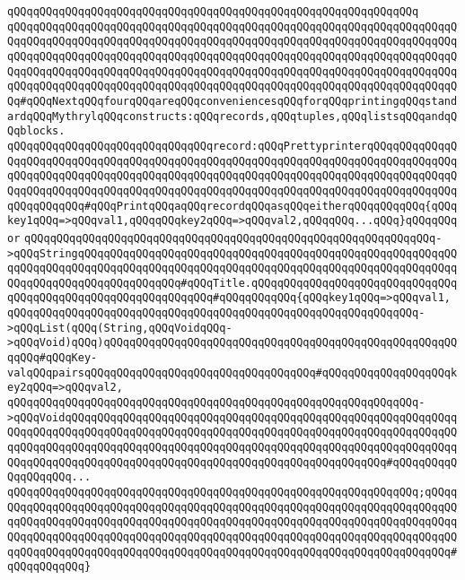 \verb|qQQqqQQqqQQqqQQqqQQqqQQqqQQqqQQqqQQqqQQqqQQqqQQqqQQqqQQqqQQqqQQq|\newline
\verb|qQQqqQQqqQQqqQQqqQQqqQQqqQQqqQQqqQQqqQQqqQQqqQQqqQQqqQQqqQQqqQQqqQQqqQQqqQQqqQQqqQQqqQQqqQQqqQQqqQQqqQQqqQQqqQQqqQQqqQQqqQQqqQQqqQQqqQQqqQQqqQQqqQQqqQQqqQQqqQQqqQQqqQQqqQQqqQQqqQQqqQQqqQQqqQQqqQQqqQQqqQQqqQQqqQQqqQQqqQQqqQQqqQQqqQQqqQQqqQQqqQQqqQQqqQQqqQQqqQQqqQQqqQQqqQQqqQQqqQQqqQQqqQQqqQQqqQQqqQQqqQQqqQQqqQQqqQQqqQQqqQQqqQQqqQQqqQQqqQQqqQQqqQQqqQQq#qQQqNextqQQqfourqQQqareqQQqconveniencesqQQqforqQQqprintingqQQqstandardqQQqMythrylqQQqconstructs:qQQqrecords,qQQqtuples,qQQqlistsqQQqandqQQqblocks.|\newline
\newline
\verb|qQQqqQQqqQQqqQQqqQQqqQQqqQQqqQQqrecord:qQQqPrettyprinterqQQqqQQqqQQqqQQqqQQqqQQqqQQqqQQqqQQqqQQqqQQqqQQqqQQqqQQqqQQqqQQqqQQqqQQqqQQqqQQqqQQqqQQqqQQqqQQqqQQqqQQqqQQqqQQqqQQqqQQqqQQqqQQqqQQqqQQqqQQqqQQqqQQqqQQqqQQqqQQqqQQqqQQqqQQqqQQqqQQqqQQqqQQqqQQqqQQqqQQqqQQqqQQqqQQqqQQqqQQqqQQqqQQqqQQqqQQq#qQQqPrintqQQqaqQQqrecordqQQqasqQQqeitherqQQqqQQqqQQq{qQQqkey1qQQq=>qQQqval1,qQQqqQQqkey2qQQq=>qQQqval2,qQQqqQQq...qQQq}qQQqqQQqor|\newline
\verb|qQQqqQQqqQQqqQQqqQQqqQQqqQQqqQQqqQQqqQQqqQQqqQQqqQQqqQQqqQQqqQQq->qQQqStringqQQqqQQqqQQqqQQqqQQqqQQqqQQqqQQqqQQqqQQqqQQqqQQqqQQqqQQqqQQqqQQqqQQqqQQqqQQqqQQqqQQqqQQqqQQqqQQqqQQqqQQqqQQqqQQqqQQqqQQqqQQqqQQqqQQqqQQqqQQqqQQqqQQqqQQqqQQq#qQQqTitle.qQQqqQQqqQQqqQQqqQQqqQQqqQQqqQQqqQQqqQQqqQQqqQQqqQQqqQQqqQQqqQQq#qQQqqQQqqQQq{qQQqkey1qQQq=>qQQqval1,|\newline
\verb|qQQqqQQqqQQqqQQqqQQqqQQqqQQqqQQqqQQqqQQqqQQqqQQqqQQqqQQqqQQqqQQq->qQQqList(qQQq(String,qQQqVoidqQQq->qQQqVoid)qQQq)qQQqqQQqqQQqqQQqqQQqqQQqqQQqqQQqqQQqqQQqqQQqqQQqqQQqqQQqqQQq#qQQqKey-valqQQqpairsqQQqqQQqqQQqqQQqqQQqqQQqqQQqqQQqqQQq#qQQqqQQqqQQqqQQqqQQqkey2qQQq=>qQQqval2,|\newline
\verb|qQQqqQQqqQQqqQQqqQQqqQQqqQQqqQQqqQQqqQQqqQQqqQQqqQQqqQQqqQQqqQQq->qQQqVoidqQQqqQQqqQQqqQQqqQQqqQQqqQQqqQQqqQQqqQQqqQQqqQQqqQQqqQQqqQQqqQQqqQQqqQQqqQQqqQQqqQQqqQQqqQQqqQQqqQQqqQQqqQQqqQQqqQQqqQQqqQQqqQQqqQQqqQQqqQQqqQQqqQQqqQQqqQQqqQQqqQQqqQQqqQQqqQQqqQQqqQQqqQQqqQQqqQQqqQQqqQQqqQQqqQQqqQQqqQQqqQQqqQQqqQQqqQQqqQQqqQQqqQQqqQQqqQQqqQQq#qQQqqQQqqQQqqQQqqQQq...|\newline
\verb|qQQqqQQqqQQqqQQqqQQqqQQqqQQqqQQqqQQqqQQqqQQqqQQqqQQqqQQqqQQqqQQq;qQQqqQQqqQQqqQQqqQQqqQQqqQQqqQQqqQQqqQQqqQQqqQQqqQQqqQQqqQQqqQQqqQQqqQQqqQQqqQQqqQQqqQQqqQQqqQQqqQQqqQQqqQQqqQQqqQQqqQQqqQQqqQQqqQQqqQQqqQQqqQQqqQQqqQQqqQQqqQQqqQQqqQQqqQQqqQQqqQQqqQQqqQQqqQQqqQQqqQQqqQQqqQQqqQQqqQQqqQQqqQQqqQQqqQQqqQQqqQQqqQQqqQQqqQQqqQQqqQQqqQQqqQQqqQQqqQQqqQQqqQQq#qQQqqQQqqQQq}|\newline

